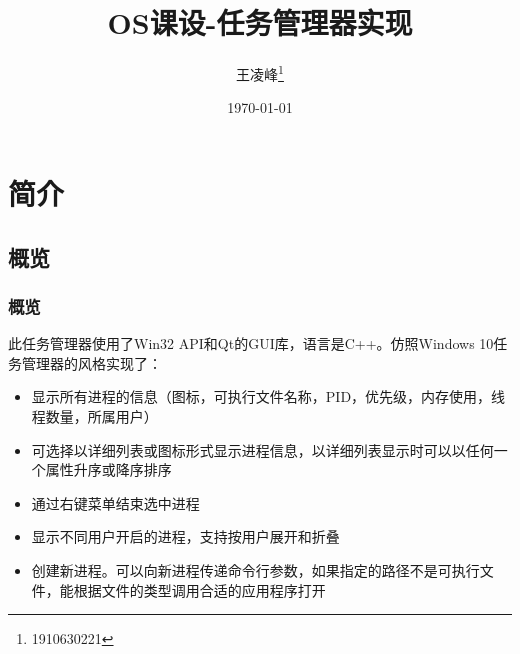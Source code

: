 \documentclass{beamer}
\title{OS课设-任务管理器实现}
\author{王凌峰\thanks{1910630221}}
\date{\today}
\begin{document}
\lstset{
    numberstyle=\footnotesize,
    stringstyle=\ttfamily,
    commentstyle=\upshape,
    showstringspaces=false,
    numbers=left,
    numbersep=8pt,
    tabsize=4,
    language=C++
}

\begin{frame}
    \maketitle
\end{frame}

\begin{frame}
    \begin{multicols}{2}
    \tableofcontents
    \end{multicols}
\end{frame}

\section{简介}
\subsection{概览}
\begin{frame}
    \frametitle{概览}

    此任务管理器使用了Win32 API和Qt的GUI库，语言是C++。仿照Windows 10任务管理器的风格实现了：

\begin{itemize}
    \item 显示所有进程的信息（图标，可执行文件名称，PID，优先级，内存使用，线程数量，所属用户）
    \item 可选择以详细列表或图标形式显示进程信息，以详细列表显示时可以以任何一个属性升序或降序排序
    \item 通过右键菜单结束选中进程
    \item 显示不同用户开启的进程，支持按用户展开和折叠
    \item 创建新进程。可以向新进程传递命令行参数，如果指定的路径不是可执行文件，能根据文件的类型调用合适的应用程序打开
\end{itemize}
\end{frame}
\end{document}
